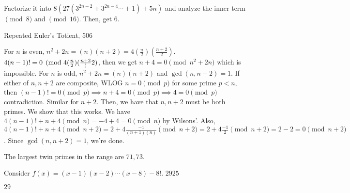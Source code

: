 \documentclass[11pt]{article}
\begin{document}
\begin{sol}
Factorize it into $8(27(3^{2n-2}+3^{2n-4}\cdots + 1)+5n)$ and analyze the inner term $\pmod{8}$ and $\pmod{16}$. Then, get $\boxed{6}$.
\end{sol}


\begin{sol}
Repeated Euler\rq{}s Totient, $\boxed{506}$
\end{sol}


\begin{sol}
For $n$ is even, $n^2+2n=(n)(n+2)=4(\frac{n}{2})(\frac{n+2}{2})$. $4(n-1)!=0\pmod{4(\frac{n}{2})(\frac{n+2}}{2})$, then we get $n+4=0\pmod{n^2+2n}$ which is impossible. For $n$ is odd, $n^2+2n=(n)(n+2)$ and $\gcd(n,n+2)=1$. If either of $n, n+2$ are composite, WLOG $n=0\pmod{p}$ for some prime $p<n$, then $(n-1)!=0\pmod{p}\implies n+4=0\pmod{p}\implies 4 =0\pmod{p}$ contradiction. Similar for $n+2$. Then, we have that $n,n+2$ must be both primes. We show that this works. We have $4(n-1)!+n+4\pmod{n}=-4+4=0\pmod{n}$ by Wilsons'. Also, $4(n-1)!+n+4\pmod{n+2}=2+4\frac{-1}{(n+1)(n)}\pmod{n+2}=2+4\frac{-1}{2}\pmod{n+2}=2-2=0\pmod{n+2}$. Since $\gcd(n,n+2)=1$, we're done.

The largest twin primes in the range are $\boxed{71},73$.
\end{sol}


\begin{sol}
Consider $f(x)=(x-1)(x-2)\cdots (x-8)-8!$.
$\boxed{2925}$
\end{sol}


\begin{sol}
$\boxed{29}$
\end{sol}

\end{document}
